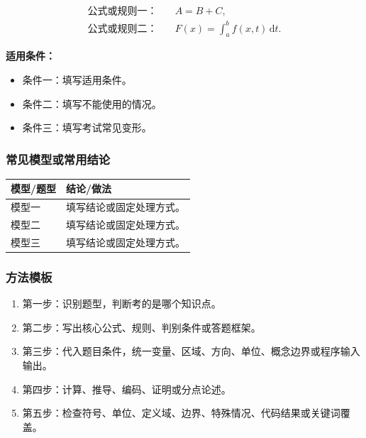 \documentclass[UTF8,zihao=-4]{ctexart}
\newcommand{\dd}{\,\mathrm d}
\begin{document}
\begin{keybox}[核心公式/规则]
\begin{align*}
\text{公式或规则一：}\quad & A = B + C, \\
\text{公式或规则二：}\quad & F(x)=\int_a^b f(x,t)\dd t.
\end{align*}

\textbf{适用条件：}
\begin{itemize}
  \item 条件一：填写适用条件。
  \item 条件二：填写不能使用的情况。
  \item 条件三：填写考试常见变形。
\end{itemize}
\end{keybox}

\subsubsection{常见模型或常用结论}

\begin{longtable}{p{}p{}}
\toprule
\textbf{模型/题型} & \textbf{结论/做法} \\
\midrule
模型一 & 填写结论或固定处理方式。 \\
模型二 & 填写结论或固定处理方式。 \\
模型三 & 填写结论或固定处理方式。 \\
\bottomrule
\end{longtable}

\subsubsection{方法模板}

\begin{methodbox}
\begin{enumerate}
  \item 第一步：识别题型，判断考的是哪个知识点。
  \item 第二步：写出核心公式、规则、判别条件或答题框架。
  \item 第三步：代入题目条件，统一变量、区域、方向、单位、概念边界或程序输入输出。
  \item 第四步：计算、推导、编码、证明或分点论述。
  \item 第五步：检查符号、单位、定义域、边界、特殊情况、代码结果或关键词覆盖。
\end{enumerate}
\end{methodbox}
\end{document}
